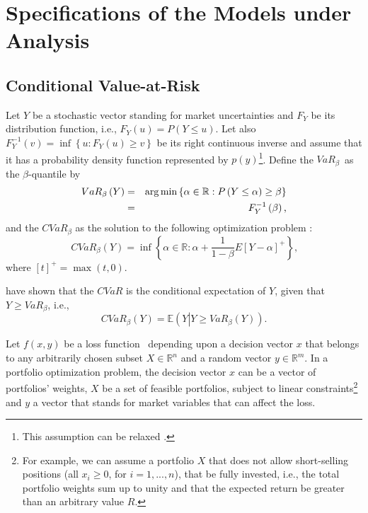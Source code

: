 \documentclass[a4paper,12pt]{report}
\begin{document}
\vspace{0.6cm}

\section{Specifications of the Models under Analysis}

\label{section2}

\subsection{Conditional Value-at-Risk}

Let $Y$ be a stochastic vector standing for market uncertainties and $F_{Y}$
be its distribution function, i.e., $F_{Y}\left( u\right) =P\left( Y\leq
u\right) $. Let also $F_{Y}^{-1}\left( v\right) =\inf \left\{ u:F_{Y}\left(
u\right) \geq v\right\} $ be its right continuous inverse and assume that it
has a probability density function represented by $p(y)$\footnote{%
	This assumption can be relaxed \citep{uryasev2013}.}. Define the $VaR_{\beta
}$\thinspace\ as the $\beta $-quantile by
\begin{eqnarray}
VaR_{\beta }\left( Y\right) &=& \arg \min \left\{ \alpha \in
\mathbb{R}
:P\left( Y\leq \alpha \right) \geq \beta \right\}  \label{one} \\
&=&F_{Y}^{-1}\left( \beta \right) \text{,}  \notag
\end{eqnarray}%
and the $CVaR_{\beta }$ as the solution to the following optimization
problem \citep{pflug2000}:
\begin{equation}
CVaR_{\beta }\left( Y\right) =\inf \left\{ \alpha \in
\mathbb{R}
:\alpha +\frac{1}{1-\beta }E\left[ Y-\alpha \right] ^{+}\right\} \text{,}
\label{two}
\end{equation}%
where $\left[ t\right] ^{+}=\max \left( t,0\right) $.

\bigskip \citet*{uryasev1999} have shown that the $CVaR$ is the conditional
expectation of $Y$, given that $Y\geq VaR_{\beta }$, i.e.,
\begin{equation}
CVaR_{\beta }\left( Y\right) =\mathbb{E}\left( Y\left\vert Y\geq VaR_{\beta
}\left( Y\right) \right. \right) .  \label{three}
\end{equation}

Let $f\left( x,y\right) $ be a loss function \ depending upon a decision
vector $x$ that belongs to any arbitrarily chosen subset $X\in
\mathbb{R}
^{n}$ and a random vector $y\in
\mathbb{R}
^{m}$. In a portfolio optimization problem, the decision vector $x$ can be a
vector of portfolios' weights, $X$ be a set of feasible portfolios,
subject to linear constraints\footnote{%
	For example, we can assume a portfolio $X$ that does not allow short-selling positions (all $x_{i}\geq 0$, for $i=1,...,n$),
	that be fully invested, i.e., the total portfolio weights sum
	up to unity and that the expected return be greater than an arbitrary value $%
	R$.} and $y$ a vector that stands for market variables that can affect the loss.
\end{document}
